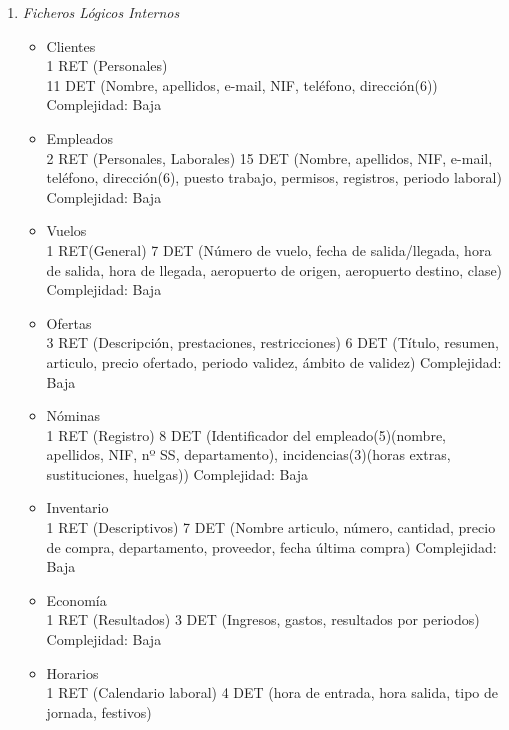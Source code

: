 
\begin{enumerate}
	\item \textit{Ficheros Lógicos Internos}
	\begin{itemize}
		\item Clientes \\
			1 RET (Personales) \\
			11 DET (Nombre, apellidos, e-mail, NIF, teléfono, dirección(6)) \\
			Complejidad: Baja\\
		\item Empleados \\
			2 RET (Personales, Laborales)
			15 DET (Nombre, apellidos, NIF, e-mail, teléfono, dirección(6), puesto trabajo, permisos, registros, periodo laboral)
			Complejidad: Baja\\
		\item Vuelos\\
			1 RET(General)
			7 DET (Número de vuelo, fecha de salida/llegada, hora de salida, hora de llegada, aeropuerto de origen, aeropuerto destino,
			clase)
			Complejidad: Baja\\
		\item Ofertas\\
			3 RET (Descripción, prestaciones, restricciones)
			6 DET (Título, resumen, articulo, precio ofertado, periodo validez, ámbito de validez)
			Complejidad: Baja\\
		\item Nóminas\\
			1 RET (Registro)
			8 DET (Identificador del empleado(5)(nombre, apellidos, NIF, nº SS, departamento), incidencias(3)(horas extras,
			sustituciones, huelgas))
			Complejidad: Baja\\
		\item Inventario\\
			1 RET (Descriptivos)
			7 DET (Nombre articulo, número, cantidad, precio de compra, departamento, proveedor, fecha última compra)
			Complejidad: Baja\\
		\item Economía\\
			1 RET (Resultados)
			3 DET (Ingresos, gastos, resultados por periodos)
			Complejidad: Baja\\
		\item Horarios\\
			1 RET (Calendario laboral)
			4 DET (hora de entrada, hora salida, tipo de jornada, festivos)

\end{itemize}
\end{enumerate}
